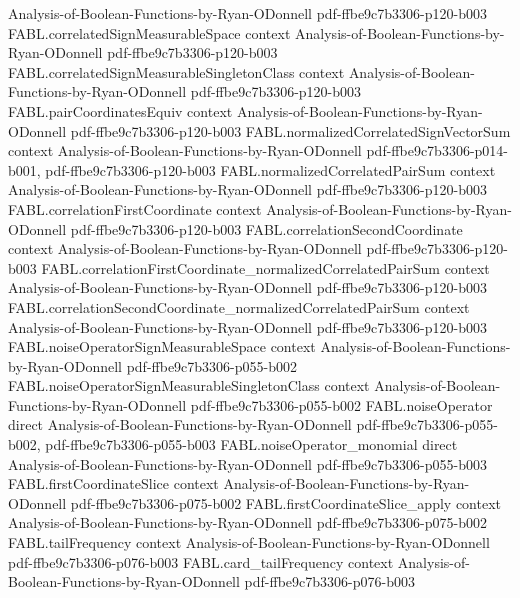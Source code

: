 \begin{theorem}
  {Analysis-of-Boolean-Functions-by-Ryan-ODonnell}
  {pdf-ffbe9c7b3306-p120-b003}
\proofstep
  {FABL.correlatedSignMeasurableSpace}
  {context}
  {Analysis-of-Boolean-Functions-by-Ryan-ODonnell}
  {pdf-ffbe9c7b3306-p120-b003}
\proofstep
  {FABL.correlatedSignMeasurableSingletonClass}
  {context}
  {Analysis-of-Boolean-Functions-by-Ryan-ODonnell}
  {pdf-ffbe9c7b3306-p120-b003}
\proofstep
  {FABL.pairCoordinatesEquiv}
  {context}
  {Analysis-of-Boolean-Functions-by-Ryan-ODonnell}
  {pdf-ffbe9c7b3306-p120-b003}
\proofstep
  {FABL.normalizedCorrelatedSignVectorSum}
  {context}
  {Analysis-of-Boolean-Functions-by-Ryan-ODonnell}
  {pdf-ffbe9c7b3306-p014-b001,
    pdf-ffbe9c7b3306-p120-b003}
\proofstep
  {FABL.normalizedCorrelatedPairSum}
  {context}
  {Analysis-of-Boolean-Functions-by-Ryan-ODonnell}
  {pdf-ffbe9c7b3306-p120-b003}
\proofstep
  {FABL.correlationFirstCoordinate}
  {context}
  {Analysis-of-Boolean-Functions-by-Ryan-ODonnell}
  {pdf-ffbe9c7b3306-p120-b003}
\proofstep
  {FABL.correlationSecondCoordinate}
  {context}
  {Analysis-of-Boolean-Functions-by-Ryan-ODonnell}
  {pdf-ffbe9c7b3306-p120-b003}
\proofstep
  {FABL.correlationFirstCoordinate_normalizedCorrelatedPairSum}
  {context}
  {Analysis-of-Boolean-Functions-by-Ryan-ODonnell}
  {pdf-ffbe9c7b3306-p120-b003}
\proofstep
  {FABL.correlationSecondCoordinate_normalizedCorrelatedPairSum}
  {context}
  {Analysis-of-Boolean-Functions-by-Ryan-ODonnell}
  {pdf-ffbe9c7b3306-p120-b003}
\proofstep
  {FABL.noiseOperatorSignMeasurableSpace}
  {context}
  {Analysis-of-Boolean-Functions-by-Ryan-ODonnell}
  {pdf-ffbe9c7b3306-p055-b002}
\proofstep
  {FABL.noiseOperatorSignMeasurableSingletonClass}
  {context}
  {Analysis-of-Boolean-Functions-by-Ryan-ODonnell}
  {pdf-ffbe9c7b3306-p055-b002}
\proofstep
  {FABL.noiseOperator}
  {direct}
  {Analysis-of-Boolean-Functions-by-Ryan-ODonnell}
  {pdf-ffbe9c7b3306-p055-b002,
    pdf-ffbe9c7b3306-p055-b003}
\proofstep
  {FABL.noiseOperator_monomial}
  {direct}
  {Analysis-of-Boolean-Functions-by-Ryan-ODonnell}
  {pdf-ffbe9c7b3306-p055-b003}
\proofstep
  {FABL.firstCoordinateSlice}
  {context}
  {Analysis-of-Boolean-Functions-by-Ryan-ODonnell}
  {pdf-ffbe9c7b3306-p075-b002}
\proofstep
  {FABL.firstCoordinateSlice_apply}
  {context}
  {Analysis-of-Boolean-Functions-by-Ryan-ODonnell}
  {pdf-ffbe9c7b3306-p075-b002}
\proofstep
  {FABL.tailFrequency}
  {context}
  {Analysis-of-Boolean-Functions-by-Ryan-ODonnell}
  {pdf-ffbe9c7b3306-p076-b003}
\proofstep
  {FABL.card_tailFrequency}
  {context}
  {Analysis-of-Boolean-Functions-by-Ryan-ODonnell}
  {pdf-ffbe9c7b3306-p076-b003}
\proofstep

\end{theorem}
